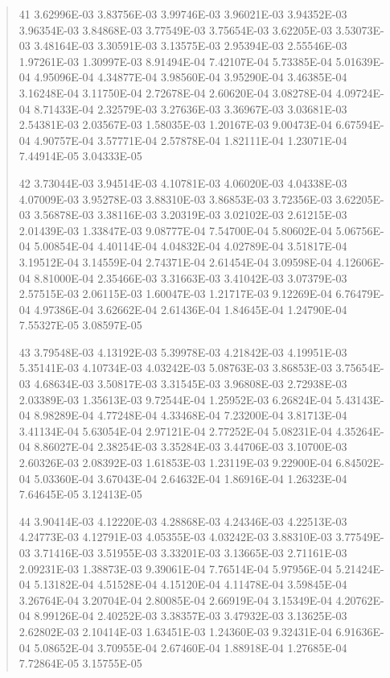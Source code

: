 \documentclass[letterpaper,10pt,english]{sphinxmanual}
\begin{document}
\begin{quote}
\begin{DUlineblock}{0em}
\item[] 41   3.62996E-03  3.83756E-03  3.99746E-03  3.96021E-03  3.94352E-03  3.96354E-03  3.84868E-03  3.77549E-03  3.75654E-03  3.62205E-03  3.53073E-03  3.48164E-03  3.30591E-03  3.13575E-03  2.95394E-03  2.55546E-03  1.97261E-03  1.30997E-03  8.91494E-04  7.42107E-04  5.73385E-04  5.01639E-04  4.95096E-04  4.34877E-04  3.98560E-04  3.95290E-04  3.46385E-04  3.16248E-04  3.11750E-04  2.72678E-04  2.60620E-04  3.08278E-04  4.09724E-04  8.71433E-04  2.32579E-03  3.27636E-03  3.36967E-03  3.03681E-03  2.54381E-03  2.03567E-03  1.58035E-03  1.20167E-03  9.00473E-04  6.67594E-04  4.90757E-04  3.57771E-04  2.57878E-04  1.82111E-04  1.23071E-04  7.44914E-05  3.04333E-05
\item[] 42   3.73044E-03  3.94514E-03  4.10781E-03  4.06020E-03  4.04338E-03  4.07009E-03  3.95278E-03  3.88310E-03  3.86853E-03  3.72356E-03  3.62205E-03  3.56878E-03  3.38116E-03  3.20319E-03  3.02102E-03  2.61215E-03  2.01439E-03  1.33847E-03  9.08777E-04  7.54700E-04  5.80602E-04  5.06756E-04  5.00854E-04  4.40114E-04  4.04832E-04  4.02789E-04  3.51817E-04  3.19512E-04  3.14559E-04  2.74371E-04  2.61454E-04  3.09598E-04  4.12606E-04  8.81000E-04  2.35466E-03  3.31663E-03  3.41042E-03  3.07379E-03  2.57515E-03  2.06115E-03  1.60047E-03  1.21717E-03  9.12269E-04  6.76479E-04  4.97386E-04  3.62662E-04  2.61436E-04  1.84645E-04  1.24790E-04  7.55327E-05  3.08597E-05
\item[] 43   3.79548E-03  4.13192E-03  5.39978E-03  4.21842E-03  4.19951E-03  5.35141E-03  4.10734E-03  4.03242E-03  5.08763E-03  3.86853E-03  3.75654E-03  4.68634E-03  3.50817E-03  3.31545E-03  3.96808E-03  2.72938E-03  2.03389E-03  1.35613E-03  9.72544E-04  1.25952E-03  6.26824E-04  5.43143E-04  8.98289E-04  4.77248E-04  4.33468E-04  7.23200E-04  3.81713E-04  3.41134E-04  5.63054E-04  2.97121E-04  2.77252E-04  5.08231E-04  4.35264E-04  8.86027E-04  2.38254E-03  3.35284E-03  3.44706E-03  3.10700E-03  2.60326E-03  2.08392E-03  1.61853E-03  1.23119E-03  9.22900E-04  6.84502E-04  5.03360E-04  3.67043E-04  2.64632E-04  1.86916E-04  1.26323E-04  7.64645E-05  3.12413E-05
\item[] 44   3.90414E-03  4.12220E-03  4.28868E-03  4.24346E-03  4.22513E-03  4.24773E-03  4.12791E-03  4.05355E-03  4.03242E-03  3.88310E-03  3.77549E-03  3.71416E-03  3.51955E-03  3.33201E-03  3.13665E-03  2.71161E-03  2.09231E-03  1.38873E-03  9.39061E-04  7.76514E-04  5.97956E-04  5.21424E-04  5.13182E-04  4.51528E-04  4.15120E-04  4.11478E-04  3.59845E-04  3.26764E-04  3.20704E-04  2.80085E-04  2.66919E-04  3.15349E-04  4.20762E-04  8.99126E-04  2.40252E-03  3.38357E-03  3.47932E-03  3.13625E-03  2.62802E-03  2.10414E-03  1.63451E-03  1.24360E-03  9.32431E-04  6.91636E-04  5.08652E-04  3.70955E-04  2.67460E-04  1.88918E-04  1.27685E-04  7.72864E-05  3.15755E-05

\end{DUlineblock}
\end{quote}
\end{document}
